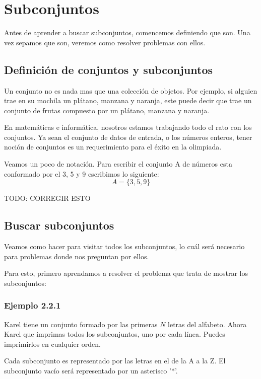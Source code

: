 \chapter*{Subconjuntos}

Antes de aprender a buscar subconjuntos, comencemos definiendo que son. Una vez sepamos que son, veremos como resolver problemas con ellos.

\section*{Definición de conjuntos y subconjuntos}
Un conjunto no es nada mas que una colección de objetos. Por ejemplo, si alguien trae en su mochila un plátano, manzana y naranja, este puede decir que trae un conjunto de frutas compuesto por un plátano, manzana y naranja.

En matemáticas e informática, nosotros estamos trabajando todo el rato con los conjuntos. Ya sean el conjunto de datos de entrada, o los números enteros, tener noción de conjuntos es un requerimiento para el éxito en la olimpiada.

Veamos un poco de notación. Para escribir el conjunto A de números esta conformado por el 3, 5 y 9 escribimos lo siguiente:
\[A=\{3,5,9\}\]

TODO: CORREGIR ESTO
\newpage
\section*{Buscar subconjuntos}

Veamos como hacer para visitar todos los subconjuntos, lo cuál será necesario para problemas donde nos preguntan por ellos.

Para esto, primero aprendamos a resolver el problema que trata de mostrar los subconjuntos:

\subsection*{Ejemplo 2.2.1}

Karel tiene un conjunto formado por las primeras \(N\) letras del alfabeto. Ahora Karel que imprimas todos los subconjuntos, uno por cada línea. Puedes imprimirlos en cualquier orden.

Cada subconjunto es representado por las letras en el de la A a la Z. El subconjunto vacío será representado por un asterisco '*'.
